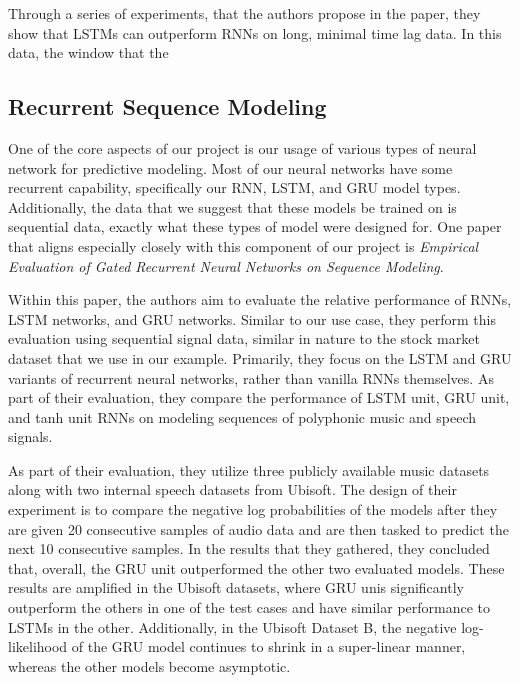 \documentclass{article}
\begin{document}
    Through a series of experiments, that the authors propose in the paper, they show that LSTMs can outperform RNNs
    on long, minimal time lag data.  In this data, the window that the


    \subsection{Recurrent Sequence Modeling}

    One of the core aspects of our project is our usage of various types of neural network for predictive modeling.
    Most of our neural networks have some recurrent capability, specifically our RNN, LSTM, and GRU model types.
    Additionally, the data that we suggest that these models be trained on is sequential data, exactly what these
    types of model were designed for.  One paper that aligns especially closely with this component of our project
    is \textit{Empirical Evaluation of Gated Recurrent Neural Networks on Sequence Modeling}\cite{recurrentModeling}.

    Within this paper, the authors aim to evaluate the relative performance of RNNs, LSTM networks, and GRU networks.
    Similar to our use case, they perform this evaluation using sequential signal data, similar in nature to the
    stock market dataset that we use in our example.  Primarily, they focus on the LSTM and GRU variants of
    recurrent neural networks, rather than vanilla RNNs themselves.  As part of their evaluation, they compare
    the performance of LSTM unit, GRU unit, and tanh unit RNNs on modeling sequences of polyphonic music and
    speech signals.

    As part of their evaluation, they utilize three publicly available music datasets along with two internal speech
    datasets from Ubisoft.  The design of their experiment is to compare the negative log probabilities of the models
    after they are given 20 consecutive samples of audio data and are then tasked to predict the next 10 consecutive
    samples.  In the results that they gathered, they concluded that, overall, the GRU unit outperformed the other
    two evaluated models.  These results are amplified in the Ubisoft datasets, where GRU unis significantly
    outperform the others in one of the test cases and have similar performance to LSTMs in the other.  Additionally,
    in the Ubisoft Dataset B, the negative log-likelihood of the GRU model continues to shrink in a super-linear manner,
    whereas the other models become asymptotic.
\end{document}
